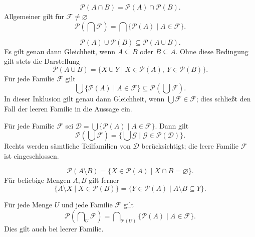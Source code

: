 \begin{theorem}
\[
 \mathcal P(A\cap B)=\mathcal P(A)\cap\mathcal P(B).
\]
Allgemeiner gilt für $\mathcal F\ne\varnothing$
\[
 \mathcal P(\bigcap\mathcal F)
       =\bigcap\{\mathcal P(A)\mid A\in\mathcal F\}.
\]
\end{theorem}

\begin{theorem}
\[
 \mathcal P(A)\cup\mathcal P(B)\subseteq\mathcal P(A\cup B).
\]
Es gilt genau dann Gleichheit, wenn $A\subseteq B$ oder
$B\subseteq A$. Ohne diese Bedingung gilt stets die Darstellung
\[
 \mathcal P(A\cup B)
   =\{X\cup Y\mid X\in\mathcal P(A),\ Y\in\mathcal P(B)\}.
\]
Für jede Familie $\mathcal F$ gilt
\[
 \bigcup\{\mathcal P(A)\mid A\in\mathcal F\}
                      \subseteq\mathcal P(\bigcup\mathcal F).
\]
In dieser Inklusion gilt genau dann Gleichheit, wenn
$\bigcup\mathcal F\in\mathcal F$; dies schließt den Fall der
leeren Familie in die Aussage ein.
\end{theorem}

\begin{theorem}
Für jede Familie $\mathcal F$ sei
$\mathcal D=\bigcup\{\mathcal P(A)\mid A\in\mathcal F\}$.
Dann gilt
\[
 \mathcal P(\bigcup\mathcal F)
   =\{\bigcup\mathcal G\mid\mathcal G\in\mathcal P(\mathcal D)\}.
\]
Rechts werden sämtliche Teilfamilien von $\mathcal D$ berücksichtigt;
die leere Familie $\mathcal F$ ist eingeschlossen.
\cite{koepke,hammack}
\end{theorem}

\begin{theorem}
\[
 \mathcal P(A\setminus B)
       =\{X\in\mathcal P(A)\mid X\cap B=\varnothing\}.
\]
Für beliebige Mengen $A,B$ gilt ferner
\[
 \{A\setminus X\mid X\in\mathcal P(B)\}
       =\{Y\in\mathcal P(A)\mid A\setminus B\subseteq Y\}.
\]
\end{theorem}

\enlargethispage{\baselineskip}
\begin{theorem}
Für jede Menge $U$ und jede Familie $\mathcal F$ gilt
\[
 \mathcal P(\bigcap\nolimits_U\mathcal F)
    =\bigcap\nolimits_{\mathcal P(U)}
                         \{\mathcal P(A)\mid A\in\mathcal F\}.
\]
Dies gilt auch bei leerer Familie.
\end{theorem}

